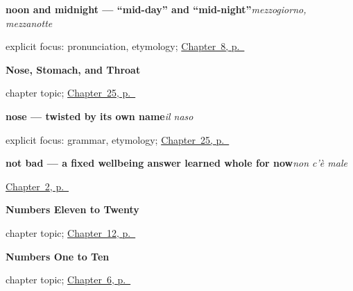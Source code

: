 \noindent\begin{minipage}[t]{\linewidth}
\raggedright
\textbf{noon and midnight — \textquotedblleft{}mid-day\textquotedblright{} and \textquotedblleft{}mid-night\textquotedblright{}}\enspace\emph{mezzogiorno, mezzanotte}\par
\footnotesize explicit focus: pronunciation, etymology; \hyperref[ch:it-telling-time]{Chapter~8, p.~\pageref*{ch:it-telling-time}}
\end{minipage}\par\smallskip

\noindent\begin{minipage}[t]{\linewidth}
\raggedright
\textbf{Nose, Stomach, and Throat}\par
\footnotesize chapter topic; \hyperref[ch:it-nose-stomach-throat]{Chapter~25, p.~\pageref*{ch:it-nose-stomach-throat}}
\end{minipage}\par\smallskip

\noindent\begin{minipage}[t]{\linewidth}
\raggedright
\textbf{nose — twisted by its own name}\enspace\emph{il naso}\par
\footnotesize explicit focus: grammar, etymology; \hyperref[ch:it-nose-stomach-throat]{Chapter~25, p.~\pageref*{ch:it-nose-stomach-throat}}
\end{minipage}\par\smallskip

\noindent\begin{minipage}[t]{\linewidth}
\raggedright
\textbf{not bad — a fixed wellbeing answer learned whole for now}\enspace\emph{non c'è male}\par
\footnotesize \hyperref[ch:it-how-are-you]{Chapter~2, p.~\pageref*{ch:it-how-are-you}}
\end{minipage}\par\smallskip

\noindent\begin{minipage}[t]{\linewidth}
\raggedright
\textbf{Numbers Eleven to Twenty}\par
\footnotesize chapter topic; \hyperref[ch:it-numbers-eleven-to-twenty]{Chapter~12, p.~\pageref*{ch:it-numbers-eleven-to-twenty}}
\end{minipage}\par\smallskip

\noindent\begin{minipage}[t]{\linewidth}
\raggedright
\textbf{Numbers One to Ten}\par
\footnotesize chapter topic; \hyperref[ch:it-numbers-one-to-ten]{Chapter~6, p.~\pageref*{ch:it-numbers-one-to-ten}}
\end{minipage}\par\smallskip

